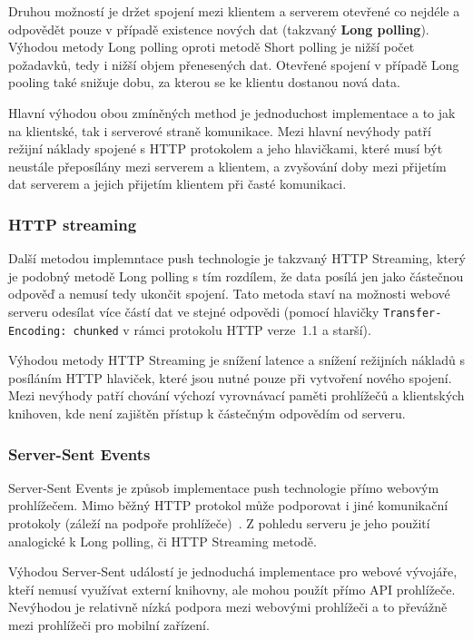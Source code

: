 Druhou možností je držet spojení mezi klientem a serverem otevřené co nejdéle a odpovědět pouze v případě existence nových dat (takzvaný \textbf{Long polling}).
Výhodou metody Long polling oproti metodě Short polling je nižší počet požadavků, tedy i nižší objem přenesených dat.
Otevřené spojení v případě Long pooling také snižuje dobu, za kterou se ke klientu dostanou nová data.

Hlavní výhodou obou zmíněných method je jednoduchost implementace a to jak na klientské, tak i serverové straně komunikace.
Mezi hlavní nevýhody patří režijní náklady spojené s \gls{HTTP} protokolem a jeho hlavičkami, které musí být neustále přeposílány mezi serverem a klientem, a zvyšování doby mezi přijetím dat serverem a jejich přijetím klientem při časté komunikaci.~\cite{pushpull:issuesRFC}

\subsubsection{\gls{HTTP} streaming}

Další metodou implemntace push technologie je takzvaný \gls{HTTP} Streaming, který je podobný metodě Long polling s tím rozdílem, že data posílá jen jako částečnou odpověď a nemusí tedy ukončit spojení.
Tato metoda staví na možnosti webové serveru odesílat více částí dat ve stejné odpovědi (pomocí hlavičky \texttt{Transfer-Encoding: chunked} v rámci protokolu \gls{HTTP} verze~1.1 a starší).

Výhodou metody \gls{HTTP} Streaming je snížení latence a snížení režijních nákladů s posíláním \gls{HTTP} hlaviček, které jsou nutné pouze při vytvoření nového spojení.
Mezi nevýhody patří chování výchozí vyrovnávací paměti prohlížečů a klientských knihoven, kde není zajištěn přístup k částečným odpovědím od serveru.~\cite{pushpull:issuesRFC}

\subsubsection{Server-Sent Events}

Server-Sent Events je způsob implementace push technologie přímo webovým prohlížečem.
Mimo běžný \gls{HTTP} protokol může podporovat i jiné komunikační protokoly (záleží na podpoře prohlížeče)~\cite{pushpull:events}.
Z pohledu serveru je jeho použití analogické k Long polling, či \gls{HTTP} Streaming metodě.~\cite{pushpull:compare}

Výhodou Server-Sent událostí je jednoduchá implementace pro webové vývojáře, kteří nemusí využívat externí knihovny, ale mohou použít přímo \gls{API} prohlížeče.
Nevýhodou je relativně nízká podpora mezi webovými prohlížeči a to převážně mezi prohlížeči pro mobilní zařízení.~\cite{pushpull:issuesRFC}

